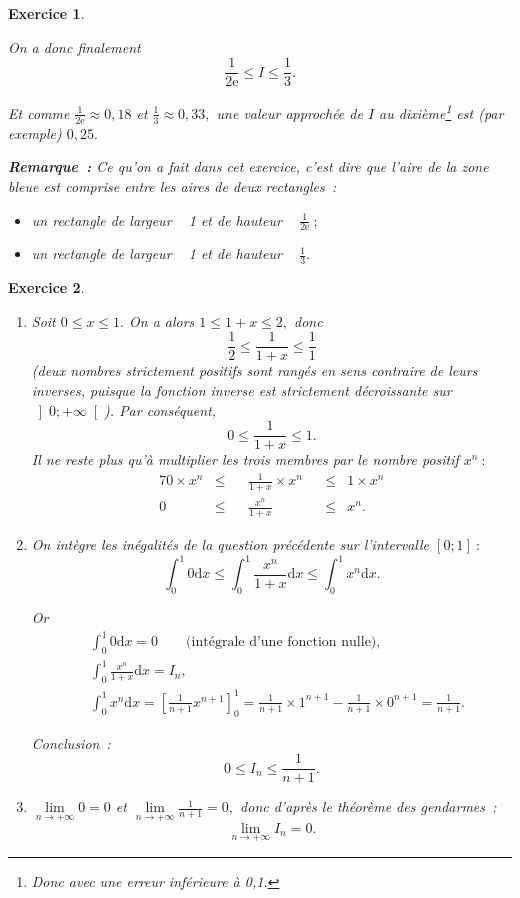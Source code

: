 \documentclass[10pt]{article}
\newtheorem{exo}{Exercice}
\begin{document}
\begin{exo}
\begin{enumerate}
On a donc finalement
\[\frac{1}{2\text{e}}\leq I\leq \frac{1}{3}.\]

Et comme $\frac{1}{2\text{e}}\approx 0,18$ et $\frac{1}{3}\approx 0,33,$ une valeur approchée de $I$ au dixième\footnote{Donc avec une erreur inférieure à 0,1.} est (par exemple) $0,25.$

\medskip

\textbf{Remarque~:} Ce qu'on a fait dans cet exercice, c'est dire que l'aire de la zone bleue est comprise entre les aires de deux rectangles~:

\begin{itemize}
\item[\textbullet] un rectangle de \og largeur \fg~{} 1 et de \og hauteur \fg~{} $\frac{1}{2\text{e}}~;$
\item[\textbullet] un rectangle de \og largeur \fg~{} 1 et de \og hauteur \fg~{} $\frac{1}{3}.$
\end{itemize}


\end{enumerate}

\end{exo}


\begin{exo}


\begin{enumerate}
\item Soit $0\leq x\leq 1.$ On a alors $1\leq 1+x\leq 2,$ donc
\[\frac{1}{2}\leq \frac{1}{1+x} \leq \frac{1}{1}\] (deux nombres strictement positifs sont rangés en sens contraire de leurs inverses, puisque la fonction inverse est strictement décroissante sur $\left]0;+\infty\right[$). Par conséquent,
\[0\leq \frac{1}{1+x}\leq 1.\] Il ne reste plus qu'à multiplier les trois membres par le nombre positif $x^n~:$
\begin{alignat*}{7}
0\times x^n&\leq &&\frac{1}{1+x}\times x^n&&\leq & 1\times x^n\\
0&\leq && \frac{x^n}{1+x}&&\leq & x^n.
\end{alignat*}


\item On intègre les inégalités de la question précédente sur l'intervalle $\left[0;1\right]~:$
\[\int_0^{1}0\mathrm{d}x\leq \int_0^{1}\frac{x^n}{1+x}\mathrm{d}x\leq \int_0^{1}x^n\mathrm{d}x.\]

Or
\begin{align*}
&\int_0^{1}0\mathrm{d}x=0\qquad \text{(intégrale d'une fonction nulle)},\\
&\int_0^{1}\frac{x^n}{1+x}\mathrm{d}x=I_n,\\
&\int_0^{1}x^n\mathrm{d}x=\left[\frac{1}{n+1}x^{n+1}\right]_0^1=\frac{1}{n+1}\times 1^{n+1}-\frac{1}{n+1}\times 0^{n+1}=\frac{1}{n+1}.
\end{align*}

Conclusion~: \[0\leq I_n\leq \frac{1}{n+1}.\]
\item $\lim\limits_{n\to +\infty}0=0$ et $\lim\limits_{n\to +\infty}\frac{1}{n+1}=0,$ donc d'après le théorème des gendarmes~:
\[\lim\limits_{n\to +\infty}I_n=0.\]
\end{enumerate}



\end{exo}
\end{document}
